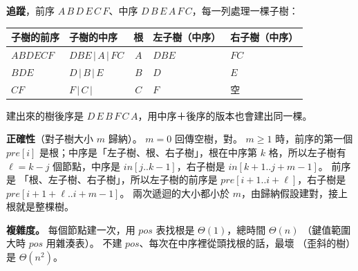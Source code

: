 \begin{pastsoln}
\textbf{追蹤}，前序 $A\,B\,D\,E\,C\,F$、中序 $D\,B\,E\,A\,F\,C$，每一列處理一棵子樹：
\begin{center}
\begin{tabular}{llcll}
\toprule
子樹的前序 & 子樹的中序 & 根 & 左子樹（中序） & 右子樹（中序） \\
\midrule
$ABDECF$ & $DBE\,|\,A\,|\,FC$ & $A$ & $DBE$ & $FC$ \\
$BDE$ & $D\,|\,B\,|\,E$ & $B$ & $D$ & $E$ \\
$CF$ & $F\,|\,C\,|$ & $C$ & $F$ & 空 \\
\bottomrule
\end{tabular}
\qquad
{}
\end{center}
建出來的樹後序是 $D\,E\,B\,F\,C\,A$，用中序＋後序的版本也會建出同一棵。

\textbf{正確性}（對子樹大小 $m$ 歸納）。 $m = 0$ 回傳空樹，對。 $m \ge 1$ 時，前序的第一個
$\mathit{pre}[i]$ 是根；中序是「左子樹、根、右子樹」，根在中序第 $k$ 格，所以左子樹有
$\ell = k - j$ 個節點，中序是 $\mathit{in}[j..k-1]$，右子樹是 $\mathit{in}[k+1..j+m-1]$。 前序是
「根、左子樹、右子樹」，所以左子樹的前序是 $\mathit{pre}[i+1..i+\ell]$，右子樹是
$\mathit{pre}[i+1+\ell..i+m-1]$。 兩次遞迴的大小都小於 $m$，由歸納假設建對，接上根就是整棵樹。

\textbf{複雜度。} 每個節點建一次，用 $\mathit{pos}$ 表找根是 $\Theta(1)$，總時間 $\Theta(n)$
（鍵值範圍大時 $\mathit{pos}$ 用雜湊表）。 不建 $\mathit{pos}$、每次在中序裡從頭找根的話，最壞
（歪斜的樹）是 $\Theta(n^2)$。
\end{pastsoln}
